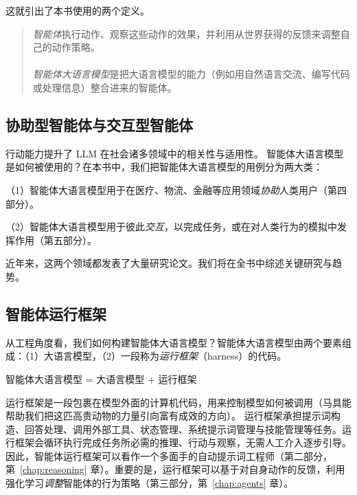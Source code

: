 这就引出了本书使用的两个定义。
\begin{quotation} 
\noindent
{\em 智能体}执行动作、观察这些动作的效果，并利用从世界获得的反馈来调整自己的动作策略。\\
\\
{\em 智能体大语言模型}是把大语言模型的能力（例如用自然语言交流、编写代码或处理信息）整合进来的智能体。
\end{quotation}

\subsection{协助型智能体与交互型智能体}
行动能力提升了 LLM 在社会诸多领域中的相关性与适用性。
智能体大语言模型是如何被使用的？在本书中，我们把智能体大语言模型的用例分为两大类：

（1）智能体大语言模型用于在医疗、物流、金融等应用领域{\em 协助}人类用户（第四部分）。

（2）智能体大语言模型用于彼此{\em 交互}，以完成任务，或在对人类行为的模拟中发挥作用（第五部分）。


近年来，这两个领域都发表了大量研究论文。我们将在全书中综述关键研究与趋势。

\subsection{智能体运行框架}
从工程角度看，我们如何构建智能体大语言模型？智能体大语言模型由两个要素组成：（1）大语言模型，（2）一段称为{\em 运行框架}（harness）的代码。
\begin{center}智能体大语言模型 = 大语言模型 + 运行框架\end{center}
运行框架是一段包裹在模型外面的计算机代码，用来控制模型如何被调用（马具能帮助我们把这匹高贵动物的力量引向富有成效的方向）。
运行框架承担提示词构造、回答处理、调用外部工具、状态管理、系统提示词管理与技能管理等任务。运行框架会循环执行完成任务所必需的推理、行动与观察，无需人工介入逐步引导。因此，智能体运行框架可以看作一个多面手的自动提示词工程师（第二部分，第~\ref{chap:reasoning} 章）。重要的是，运行框架可以基于对自身动作的反馈，利用强化学习{\em 调整}智能体的行为策略（第三部分，第~\ref{chap:agents} 章）。

